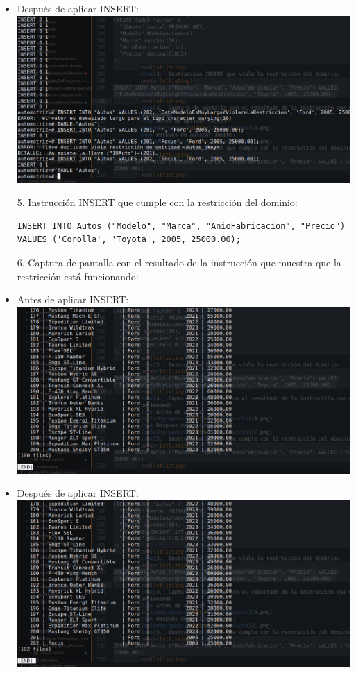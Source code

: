 \documentclass[12pt]{article}
\begin{document}
\begin{itemize}
        \item Después de aplicar INSERT:
        \includegraphics[width=1.0\textwidth]{E.png}
        \item[5.] Instrucción INSERT que cumple con la restricción del dominio:
        \begin{lstlisting}
INSERT INTO Autos ("Modelo", "Marca", "AnioFabricacion", "Precio") VALUES ('Corolla', 'Toyota', 2005, 25000.00);            
        \end{lstlisting}
        \item[6.] Captura de pantalla con el resultado de la instrucción que muestra que la restricción está funcionando:
        \item Antes de aplicar INSERT:
        \includegraphics[width=1.0\textwidth]{F.png}
        \item Después de aplicar INSERT:
        \includegraphics[width=1.0\textwidth]{G.png}
    \end{itemize}
    
\end{document}
